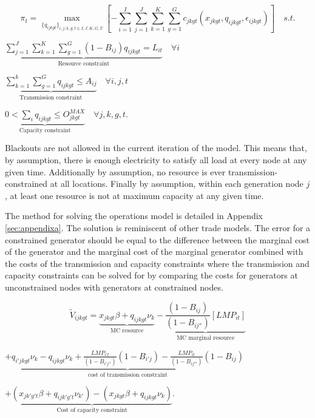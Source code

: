 \documentclass[12pt]{article}
\begin{document}
\begin{equation}
\pi_{t}=\max_{\{q_{ijkgt}\}_{i,j,k,g,t\in I,J,K,G,T}} [-\sum_{i=1}^I\sum_{j=1}^J \sum_{k=1}^K \sum_{g=1}^G c_{jkgt}(x_{jkgt},q_{ijkgt},\epsilon_{ijkgt})] \mspace{18mu} s.t.
 \end{equation}
   \begin{center}
     $\underbrace{\sum_{j=1}^J\sum_{k=1}^K \sum_{g=1}^G (1-B_{ij})q_{ijkgt}=L_{it}}_\text{Resource constraint} \mspace{18mu} \forall i$
 \end{center}
 \begin{center}
    $\underbrace{\sum_{k=1}^k \sum_{g=1}^G q_{ijkgt}\leq A_{ij}}_\text{Transmission constraint} \mspace{18mu} \forall i,j,t$
 \end{center}
   \begin{center}
     $\underbrace{0<\sum_{i} q_{ijkgt}\leq O_{jkgt}^{MAX}}_\text{Capacity constraint} \mspace{18mu} \forall j,k,g,t.$
 \end{center}

 Blackouts are not allowed in the current iteration of the model. This means that, by assumption, there is enough electricity to satisfy all load at every node at any given time. Additionally by assumption, no resource is ever transmission-constrained at all locations. Finally by assumption, within each generation node $j$, at least one resource is not at maximum capacity at any given time.

The method for solving the operations model is detailed in Appendix \ref{sec:appendixa}. The solution is reminiscent of other trade models. The error for a constrained generator should be equal to the difference between the marginal cost of the generator and the marginal cost of the marginal generator combined with the costs of the transmission and capacity constraints where the transmission and capacity constraints can be solved for by comparing the costs for generators at unconstrained nodes with generators at constrained nodes.

\begin{equation}\label{mlequation}
\tilde{V}_{ijkgt}=\underbrace{x_{jkgt}\beta+q_{ijkgt}\nu_k}_\text{MC resource}-\underbrace{\frac{(1-B_{ij})}{(1-B_{ij''})}[LMP_{it}]}_\text{MC marginal resource}
\end{equation}
\begin{center}
$+\underbrace{q_{i'jkgt}\nu_k-q_{ijkgt}\nu_k+\frac{LMP_{i't}}{(1-B_{i'j''})}(1-B_{i'j})-
\frac{LMP_{it}}{(1-B_{ij'''})}(1-B_{ij})}_\text{cost of transmission constraint}$

$+\underbrace{(x_{jk'g't}\beta+q_{ijk'g't}\nu_{k'})-(x_{jkgt}\beta+q_{ijkgt}\nu_k)}_\text{Cost of capacity constraint}$.
\end{center}
\end{document}
